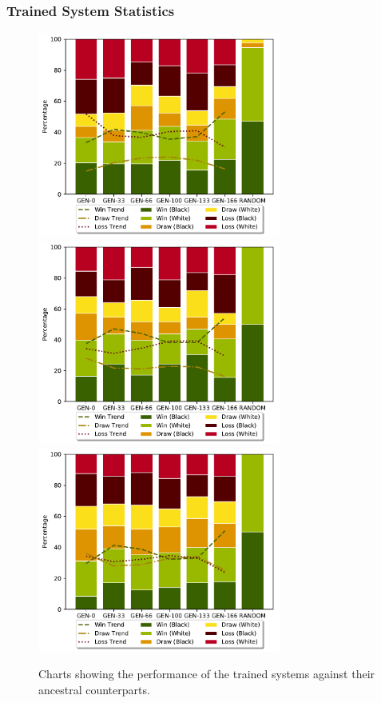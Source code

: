 \documentclass{beamer}
\begin{document}
  \begin{frame}

    \frametitle{Trained System Statistics} 
    \begin{figure}[!ht]
      \centering
      \includegraphics[width=80mm]{images/results/1ply/gm_net_stats.pdf}
      \includegraphics[width=80mm]{images/results/3ply/gm_net_stats.pdf}
      \includegraphics[width=80mm]{images/results/6ply/gm_net_stats.pdf}
      \caption{Charts showing the performance of the trained systems against their ancestral counterparts.\label{net_stats}}
  \end{figure}
  
  \end{frame}
\end{document}
